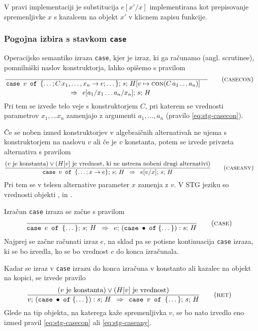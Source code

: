 V pravi implementaciji je substitucija $e[x'/x]$ implementirana kot prepisovanje spremenljivke $x$ s kazalcem na objekt $x'$ v klicnem zapisu funkcije.

\subsubsection{Pogojna izbira s stavkom \texttt{case}}

Operacijsko semantiko izraza \texttt{case}, kjer je izraz, ki ga računamo (angl. scrutinee), pomnilniški naslov konstruktorja, lahko opišemo s pravilom
\begin{equation}
	\linfer[casecon]{}{
		\texttt{case} \enspace v \enspace \texttt{of} \enspace \{ \dots; C \, x_1, \dots, x_n \to e; \dots \}; \, s; \, H[v \mapsto \textsc{con}(C \, a_1 \dots a_n)]
	}{
		e[a_1 / x_1 \dots a_n / x_n]; \, s; \, H
	}
\label{eq:stg-casecon}
\end{equation}
Pri tem se izvede telo veje s konstruktorjem $C$, pri katerem se vrednosti parametrov $x_1, \dots x_n$ zamenjajo z argumenti $a_1, \dots, a_n$ (pravilo \ref{eq:stg-casecon}).

Če se noben izmed konstruktorjev v algebraičnih alternativah ne ujema s konstruktorjem na naslovu $v$ ali če je $v$ konstanta, potem se izvede privzeta alternativa s pravilom
\begin{equation*}
	\infer[caseany]{
		(\text{$v$ je konstanta}) \lor (\text{$H[v]$ je vrednost, ki ne ustreza nobeni drugi alternativi})
	}{
		\texttt{case} \enspace v \enspace \texttt{of} \enspace \{ \dots; x \to e \}; \, s; \, H
	}{
		e[v/x]; \, s; \, H
	}
\label{eq:stg-caseany}
\end{equation*}
Pri tem se v telesu alternative parameter $x$ zamenja z $v$. V STG jeziku so vrednosti objekti ,  in .

Izračun \texttt{case} izraza se začne s pravilom
\begin{equation*}
	\infer[case]{}{
		\texttt{case} \enspace e \enspace \texttt{of} \enspace \{ \dots \}; \, s; \, H
	}{
		e; \, (\texttt{case} \; \bullet \; \texttt{of} \; \{ \dots \}) : s; \, H
	}
\label{eq:stg-case}
\end{equation*}
Najprej se začne računati izraz $e$, na sklad pa se potisne kontinuacija \texttt{case} izraza, ki se bo izvedla, ko se bo vrednost $e$ do konca izračunala.

Kadar se izraz v \texttt{case} izrazu do konca izračuna v konstanto ali kazalec na objekt na kopici, se izvede pravilo
\begin{equation}
	\infer[ret]{
		(\text{$v$ je konstanta}) \lor (\text{$H[v]$ je vrednost})
	}{
		v; \, (\texttt{case} \; \bullet \; \texttt{of} \; \{ \dots \}) : s; \, H
	}{
		\texttt{case} \enspace v \enspace \texttt{of} \enspace \{ \dots \}; \, s; \, H
	}
\label{eq:stg-ret}
\end{equation}
Glede na tip objekta, na katerega kaže spremenljivka $v$, se bo nato izvedlo eno izmed pravil \ref{eq:stg-casecon} ali \ref{eq:stg-caseany}.

